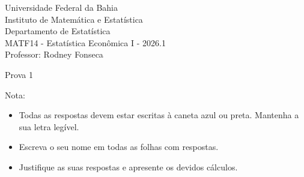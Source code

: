 \documentclass{article}
\date{--/--/----} %
\begin{document}
\begin{flushleft}
	Universidade Federal da Bahia\\
	Instituto de Matemática e Estatística\\
	Departamento de Estatística\\
	MATF14 - Estatística Econômica I - 2026.1\\
	Professor: Rodney Fonseca \\
\end{flushleft}

\begin{center}
	\begin{Large}
		Prova 1 \\
	\end{Large}	
\end{center}

\hspace{2em} Nota: 

\vspace{1em}

\begin{flushleft}
\begin{small}

\begin{itemize}
	\item Todas as respostas devem estar escritas à caneta azul ou preta. Mantenha a sua letra legível.
	\item Escreva o seu nome em todas as folhas com respostas.
	\item Justifique as suas respostas e apresente os devidos cálculos.
\end{itemize}

\end{small}
\end{flushleft}

\vspace{1em}

\end{document}

